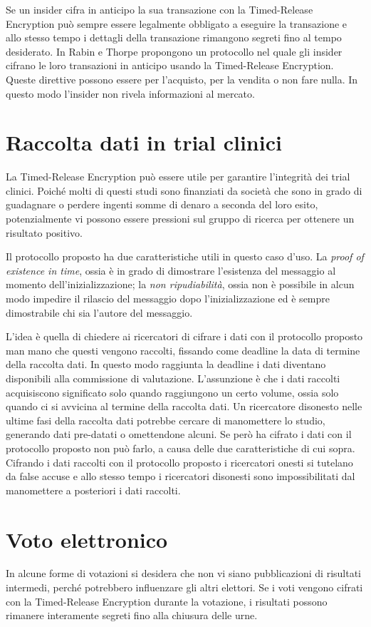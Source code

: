 Se un insider cifra in anticipo la sua transazione con la Timed-Release Encryption
può sempre essere legalmente obbligato a eseguire la transazione e allo stesso tempo
i dettagli della transazione rimangono segreti fino al tempo desiderato.
In \cite{rabin2006time} Rabin e Thorpe propongono un protocollo nel quale gli insider
cifrano le loro transazioni in anticipo usando la Timed-Release Encryption.
Queste direttive possono essere per l'acquisto, per la vendita o non fare nulla. In questo
modo l'insider non rivela informazioni al mercato.

\section{Raccolta dati in trial clinici}La Timed-Release Encryption può essere utile per garantire l'integrità dei trial clinici.
Poiché molti di questi studi sono finanziati da società che sono in grado di guadagnare
o perdere ingenti somme di denaro a seconda del loro esito,
potenzialmente vi possono essere pressioni sul gruppo di ricerca per ottenere un risultato positivo.

Il protocollo proposto ha due caratteristiche utili in questo caso d'uso. La \textit{proof of existence in time}, ossia è in grado di dimostrare l'esistenza del messaggio al momento dell'inizializzazione; la \textit{non ripudiabilità}, ossia non è possibile in alcun modo impedire il rilascio del messaggio dopo l'inizializzazione ed è sempre dimostrabile chi sia l'autore del messaggio.

L'idea è quella di chiedere ai ricercatori di cifrare i dati con il protocollo proposto man mano che questi vengono raccolti, fissando come deadline la data di termine della raccolta dati. In questo modo raggiunta la deadline i dati diventano disponibili alla commissione di valutazione. L'assunzione è che i dati raccolti acquisiscono significato solo quando raggiungono un certo volume, ossia solo quando ci si avvicina al termine della raccolta dati. Un ricercatore disonesto nelle ultime fasi della raccolta dati potrebbe cercare di manomettere lo studio, generando dati pre-datati o omettendone alcuni. Se però ha cifrato i dati con il protocollo proposto non può farlo, a causa delle due caratteristiche di cui sopra. Cifrando i dati raccolti con il protocollo proposto i ricercatori onesti si tutelano da false accuse e allo stesso tempo i ricercatori disonesti sono impossibilitati dal manomettere a posteriori i dati raccolti.


\section{Voto elettronico}
In alcune forme di votazioni si desidera che non vi siano pubblicazioni di risultati intermedi,
perché potrebbero influenzare gli altri elettori. Se i voti vengono cifrati con
la Timed-Release Encryption durante la votazione, i risultati possono rimanere interamente segreti
fino alla chiusura delle urne.
